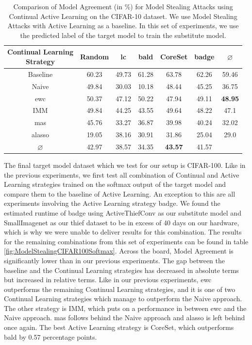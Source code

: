 \begin{table}[h]
    \centering
    \begin{tabular}{c | c c c c c | c} 
        \hline
        \diagbox[width=11em]{Active \\ Learning Strategy}{Continual Learning \\ Strategy} & Random & \gls{lc} & \gls{bald} & CoreSet & \gls{badge} & $\varnothing$\\ 
        \hline 
        Baseline & 60.23 & 49.73 & 61.28 & 63.78 & 62.26 & 59.46\\
        \hline
        Naive & 49.84 & 30.03 & 10.18 & 48.44 & 45.25 & 36.75\\
        \gls{ewc} & 50.37 & 47.12 & 50.22 & 47.94 & 49.11 & \textbf{48.95} \\
        IMM & 49.84 & 44.25 & 43.55 & 49.64 & 48.22 & 47.1\\
        \gls{mas} & 45.76 & 33.27 & 36.87 & 39.98 & 40.24 & 32.02\\
        \gls{alasso} & 19.05 & 38.16 & 30.91 & 31.86 & 25.04 & 29.0\\
        \hline
        $\varnothing$ & 42.97 & 38.57 & 34.35 & \textbf{43.57} & 41.57\\
        \hline
    \end{tabular}
    \caption{Comparison of Model Agreement (in \%) for Model Stealing Attacks using Continual Active Learning on the CIFAR-10 dataset. We use Model Stealing Attacks with Active Learning as a baseline. In this set of experiments,
    we use the predicted label of the target model to train the substitute model.}
    \label{fig:ModelStealingCIFAR10Label}
\end{table}

The final target model dataset which we test for our setup is CIFAR-100. Like in the previous experiments, we first test all combination of Continual and Active Learning strategies trained on the softmax output of the target model
and compare them to the baseline of Active Learning. An exception to this are all experiments involving the Active Learning strategy \gls{badge}. We found the estimated runtime of \gls{badge} using ActiveThiefConv as our substitute model and SmallImagenet as our thief dataset
to be in excess of 40 days on our hardware, which is why we were unable to deliver results for this combination. The results for the remaining combinations from this set of experiments can be found in table \ref{fig:ModelStealingCIFAR100Softmax}.
Across the board, Model Agreement is significantly lower than in our previous experiments. The gap between the baseline and the Continual Learning strategies has decreased in absolute terms but increased in relative terms. Like in our previous experiments, \gls{ewc} outperforms
the remaining Continual Learning strategies, and it is one of two Continual Learning strategies which manage to outperform the Naive approach. The other strategy is IMM, which puts on a performance in between \gls{ewc} and the Naive approach. \gls{mas} follows behind the Naive approach
and \gls{alasso} is left behind once again. The best Active Learning strategy is CoreSet, which outperforms \gls{bald} by 0.57 percentage points. \par

